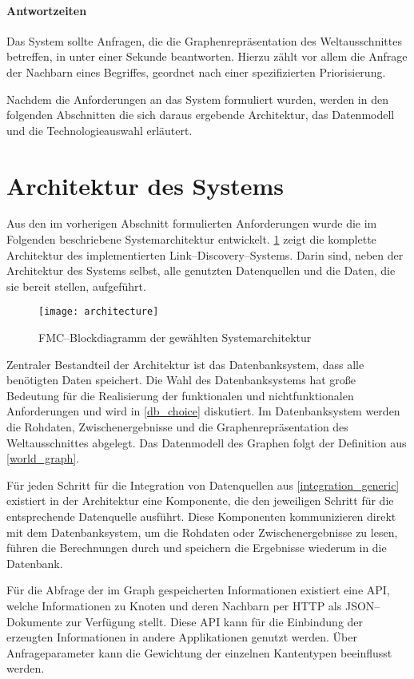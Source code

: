 \paragraph{Antwortzeiten} Das System sollte Anfragen, die die Graphenrepräsentation des Weltausschnittes betreffen, in unter einer Sekunde beantworten. Hierzu zählt vor allem die Anfrage der Nachbarn eines Begriffes, geordnet nach einer spezifizierten Priorisierung.

Nachdem die Anforderungen an das System formuliert wurden, werden in den folgenden Abschnitten die sich daraus ergebende Architektur, das Datenmodell und die Technologieauswahl erläutert.

\section{Architektur des Systems}
\label{architecture}

Aus den im vorherigen Abschnitt formulierten Anforderungen wurde die im Folgenden beschriebene Systemarchitektur entwickelt. \cref{fig:architecture} zeigt die komplette Architektur des implementierten Link--Discovery--Systems. Darin sind, neben der Architektur des Systems selbst, alle genutzten Datenquellen und die Daten, die sie bereit stellen, aufgeführt.

\begin{figure}[ht]
\centering
\texttt{[image: architecture]}
\caption{FMC--Blockdiagramm der gewählten Systemarchitektur}
\label{fig:architecture}
\end{figure}

Zentraler Bestandteil der Architektur ist das Datenbanksystem, dass alle benötigten Daten speichert. Die Wahl des Datenbanksystems hat große Bedeutung für die Realisierung der funktionalen und nichtfunktionalen Anforderungen und wird in \cref{db_choice} diskutiert. Im Datenbanksystem werden die Rohdaten, Zwischenergebnisse und die Graphenrepräsentation des Weltausschnittes abgelegt. Das Datenmodell des Graphen folgt der Definition aus \cref{world_graph}.

Für jeden Schritt für die Integration von Datenquellen aus \cref{integration_generic} existiert in der Architektur eine Komponente, die den jeweiligen Schritt für die entsprechende Datenquelle ausführt. Diese Komponenten kommunizieren direkt mit dem Datenbanksystem, um die Rohdaten oder Zwischenergebnisse zu lesen, führen die Berechnungen durch und speichern die Ergebnisse wiederum in die Datenbank.

Für die Abfrage der im Graph gespeicherten Informationen existiert eine API, welche Informationen zu Knoten und deren Nachbarn per HTTP als JSON--Dokumente \cite{json2006} zur Verfügung stellt. Diese API kann für die Einbindung der erzeugten Informationen in andere Applikationen genutzt werden. Über Anfrageparameter kann die Gewichtung der einzelnen Kantentypen beeinflusst werden.

